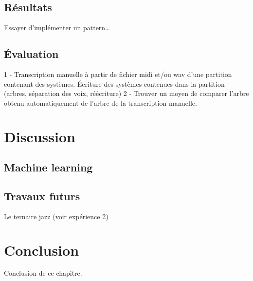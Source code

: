 \subsection{Résultats}
Essayer d’implémenter un pattern…
\subsection{Évaluation}
1 - Transcription manuelle à partir de fichier midi et/ou wav d’une partition contenant des systèmes. Écriture des systèmes contenues dans la partition (arbres, séparation des voix, réécriture)
2 - Trouver un moyen de comparer l’arbre obtenu automatiquement de l’arbre de la transcription manuelle.
\section{Discussion}
\subsection{Machine learning}
\subsection{Travaux futurs}
Le ternaire jazz (voir expérience 2)
\section{Conclusion}
Conclusion de ce chapitre.